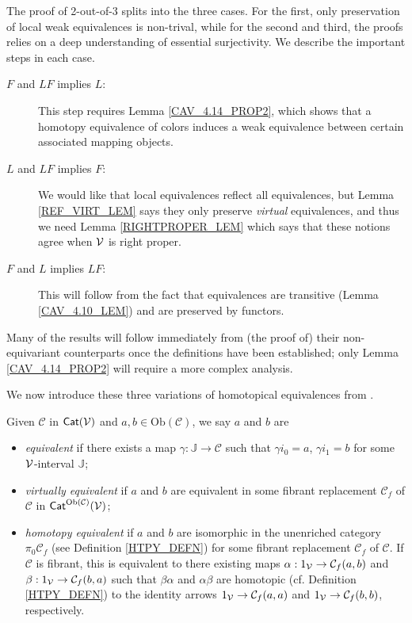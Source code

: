 \documentclass[a4paper,10pt
,draft
]{article}%
\newcommand{\J}{\mathbb J}
\renewcommand{\1}{\eta}%
\begin{document}
The proof of 2-out-of-3 splits into the three cases. For the first, only preservation of local weak equivalences is non-trival, while for the second and third, the proofs relies on a deep understanding of essential surjectivity.
We describe the important steps in each case.
\begin{description}
\item [$F$ and $LF$ implies $L$:] This step requires Lemma \ref{CAV_4.14_PROP2}, which shows that a homotopy equivalence of colors induces a weak equivalence between certain associated mapping objects.
\item [$L$ and $LF$ implies $F$:] We would like that local equivalences reflect all equivalences, but Lemma \ref{REF_VIRT_LEM} says they only preserve \textit{virtual} equivalences, and thus we need Lemma \ref{RIGHTPROPER_LEM} which says that these notions agree when $\mathcal V$ is right proper.
\item [$F$ and $L$ implies $LF$:] This will follow from the fact that equivalences are transitive (Lemma \ref{CAV_4.10_LEM}) and are preserved by functors.
\end{description}

Many of the results will follow immediately from (the proof of) their non-equivariant counterparts once the definitions have been established; 
only Lemma \ref{CAV_4.14_PROP2} will require a more complex analysis.

We now introduce these three variations of homotopical equivalences from \cite{Cav, BM13}.
\begin{definition}
      \label{EQUIV_DEF}
      Given $\mathcal{C}$ in  $\mathsf{Cat}(\mathcal V)$ and $a,b\in\mathrm{Ob}(\mathcal C)$, we say $a$ and $b$ are
      \begin{itemize}
      \item {\em equivalent} if there exists a map $\gamma: \J \to \mathcal C$ such that
            $\gamma i_0 = a$, $\gamma i_1 = b$
            for some $\mathcal V$-interval $\J$;
      \item {\em virtually equivalent} if $a$ and $b$ are equivalent in some fibrant replacement
            $\mathcal C_f$ of $\mathcal C$ in $\mathsf{Cat}^{\mathrm{Ob}(\mathcal C)}(\mathcal V)$;
      \item {\em homotopy equivalent} if $a$ and $b$ are isomorphic in the unenriched category $\pi_0 \mathcal C_f$ (see Definition \ref{HTPY_DEFN})
            for some fibrant replacement $\mathcal C_f$ of $\mathcal C$.
            If $\mathcal C$ is fibrant, this is equivalent to 
            there existing maps
            $\alpha: 1_{\mathcal V} \to \mathcal C_f(a,b)$ and $\beta: 1_{\mathcal V}\to \mathcal C_f(b,a)$ such that
            $\beta\alpha$ and $\alpha\beta$ are homotopic (cf. Definition \ref{HTPY_DEFN})
            to the identity arrows
            $1_{\mathcal V} \to \mathcal C_f(a,a)$ and $1_{\mathcal V} \to \mathcal C_f(b,b)$, respectively.
      \end{itemize}
\end{definition}
\end{document}
